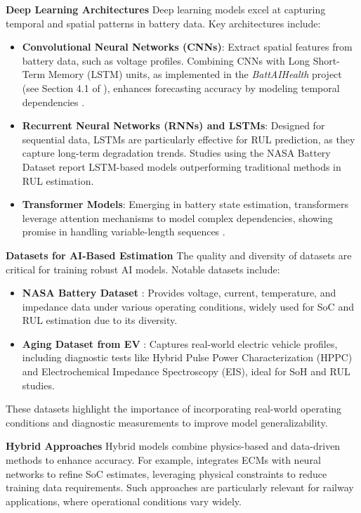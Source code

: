 \textbf{Deep Learning Architectures}
Deep learning models excel at capturing temporal and spatial patterns in battery data. Key architectures include:
\begin{itemize}
    \item \textbf{Convolutional Neural Networks (CNNs)}: Extract spatial features from battery data, such as voltage profiles. Combining CNNs with Long Short-Term Memory (LSTM) units, as implemented in the \textit{BattAIHealth} project (see Section 4.1 of \cite{Report}), enhances forecasting accuracy by modeling temporal dependencies \cite{Ref4}.
    \item \textbf{Recurrent Neural Networks (RNNs) and LSTMs}: Designed for sequential data, LSTMs are particularly effective for RUL prediction, as they capture long-term degradation trends. Studies using the NASA Battery Dataset \cite{Ref1} report LSTM-based models outperforming traditional methods in RUL estimation.
    \item \textbf{Transformer Models}: Emerging in battery state estimation, transformers leverage attention mechanisms to model complex dependencies, showing promise in handling variable-length sequences \cite{Ref5}.
\end{itemize}

\textbf{Datasets for AI-Based Estimation}
The quality and diversity of datasets are critical for training robust AI models. Notable datasets include:
\begin{itemize}
    \item \textbf{NASA Battery Dataset} \cite{Ref1}: Provides voltage, current, temperature, and impedance data under various operating conditions, widely used for SoC and RUL estimation due to its diversity.
    \item \textbf{Aging Dataset from EV} \cite{Ref3}: Captures real-world electric vehicle profiles, including diagnostic tests like Hybrid Pulse Power Characterization (HPPC) and Electrochemical Impedance Spectroscopy (EIS), ideal for SoH and RUL studies.
\end{itemize}
These datasets highlight the importance of incorporating real-world operating conditions and diagnostic measurements to improve model generalizability.

\textbf{Hybrid Approaches}
Hybrid models combine physics-based and data-driven methods to enhance accuracy. For example, \cite{Ref5} integrates ECMs with neural networks to refine SoC estimates, leveraging physical constraints to reduce training data requirements. Such approaches are particularly relevant for railway applications, where operational conditions vary widely.


